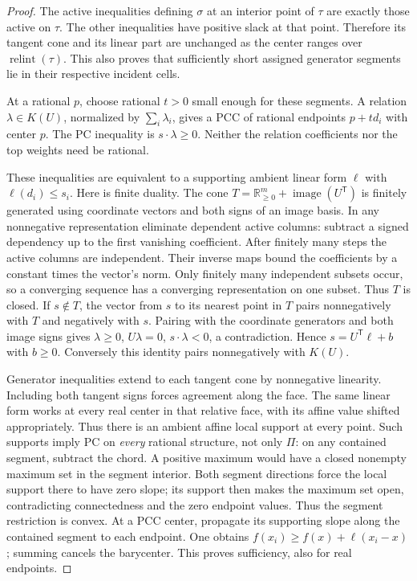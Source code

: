 \documentclass[11pt]{article}
\newcommand{\R}{\mathbb R}
\newcommand{\relint}{\operatorname{relint}}
\begin{document}
\begin{proof}
The active inequalities defining $\sigma$ at an interior point of
$\tau$ are exactly those active on $\tau$. The other inequalities
have positive slack at that point. Therefore its tangent cone and its
linear part are unchanged as the center ranges over $\relint(\tau)$.
This also proves that sufficiently short assigned generator segments
lie in their respective incident cells.

At a rational $p$, choose rational $t>0$ small enough for these
segments. A relation $\lambda\in K(U)$, normalized by
$\sum_i\lambda_i$, gives a PCC of rational endpoints $p+td_i$ with
center $p$. The PC inequality is $s\cdot\lambda\geq0$. Neither the
relation coefficients nor the top weights need be rational.

These inequalities are equivalent to a supporting ambient linear
form $\ell$ with $\ell(d_i)\leq s_i$. Here is finite duality. The
cone $T=\R_{\geq0}^m+\operatorname{image}(U^{\mathsf T})$ is finitely
generated using coordinate vectors and both signs of an image basis.
In any nonnegative representation eliminate dependent active columns:
subtract a signed dependency up to the first vanishing coefficient.
After finitely many steps the active columns are independent. Their
inverse maps bound the coefficients by a constant times the vector's
norm. Only finitely many independent subsets occur, so a converging
sequence has a converging representation on one subset. Thus $T$ is
closed. If $s\notin T$, the vector from $s$ to its nearest point in
$T$ pairs nonnegatively with $T$ and negatively with $s$. Pairing with
the coordinate generators and both image signs gives
$\lambda\geq0$, $U\lambda=0$, $s\cdot\lambda<0$, a contradiction.
Hence $s=U^{\mathsf T}\ell+b$ with $b\geq0$. Conversely this identity
pairs nonnegatively with $K(U)$.

Generator inequalities extend to each tangent cone by nonnegative
linearity. Including both tangent signs forces agreement along the
face. The same linear form works at every real center in that relative
face, with its affine value shifted appropriately. Thus there is an
ambient affine local support at every point. Such supports imply PC
on \emph{every} rational structure, not only $\Pi$: on any contained
segment, subtract the chord. A positive maximum would have a closed
nonempty maximum set in the segment interior. Both segment directions
force the local support there to have zero slope; its support then
makes the maximum set open, contradicting connectedness and the zero
endpoint values. Thus the segment restriction is convex. At a PCC
center, propagate its supporting slope along the contained segment
to each endpoint. One obtains
$f(x_i)\geq f(x)+\ell(x_i-x)$; summing cancels the barycenter.
This proves sufficiency, also for real endpoints.


\end{proof}
\end{document}
